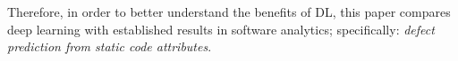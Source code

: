 \documentclass[10pt,compsoc,twocolumn]{IEEEtran}
\newcommand{\bi}{\begin{itemize}}
\begin{document}
Therefore,
in order to  better understand the benefits of DL, 
this paper
compares deep learning with  established results in software analytics;
specifically: {\em defect prediction from static code attributes}. 
\end{document}
